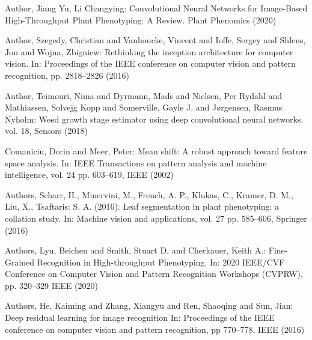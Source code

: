 \documentclass[runningheads]{llncs}
\begin{document}
%
%
%
% 
% 
%
\begin{thebibliography}{8}
Author, Jiang Yu, Li Changying:
Convolutional Neural Networks for Image-Based High-Throughput Plant Phenotyping: A Review.
Plant Phenomics (2020)

Author, Szegedy, Christian and Vanhoucke, Vincent and Ioffe, Sergey and Shlens, Jon and Wojna, Zbigniew:
Rethinking the inception architecture for computer vision.
In: Proceedings of the IEEE conference on computer vision and pattern recognition, pp. 2818--2826 (2016) 

Author, Teimouri, Nima and Dyrmann, Mads and Nielsen, Per Rydahl and Mathiassen, Solvejg Kopp and Somerville, Gayle J. and Jørgensen, Rasmus Nyholm:
Weed growth stage estimator using deep convolutional neural networks.
vol. 18, Sensors (2018)

Comaniciu, Dorin and Meer, Peter:
Mean shift: A robust approach toward feature space analysis.
In: IEEE Transactions on pattern analysis and machine intelligence, vol. 24 pp. 603--619, IEEE (2002)

Authors, Scharr, H., Minervini, M., French, A. P., Klukas, C., Kramer, D. M., Liu, X., Tsaftaris: S. A. (2016). 
Leaf segmentation in plant phenotyping: a collation study.
In: Machine vision and applications, vol. 27 pp. 585--606, Springer (2016) 

Authors, Lyu, Beichen and Smith, Stuart D. and Cherkauer, Keith A.:
Fine-Grained Recognition in High-throughput Phenotyping.
In: 2020 IEEE/CVF Conference on Computer Vision and Pattern Recognition Workshops (CVPRW), pp. 320--329 IEEE (2020)

Authors, He, Kaiming and Zhang, Xiangyu and Ren, Shaoqing and Sun, Jian:
Deep residual learning for image recognition
In: Proceedings of the IEEE conference on computer vision and pattern recognition,
pp 770--778, IEEE (2016)




\end{thebibliography}
\end{document}
